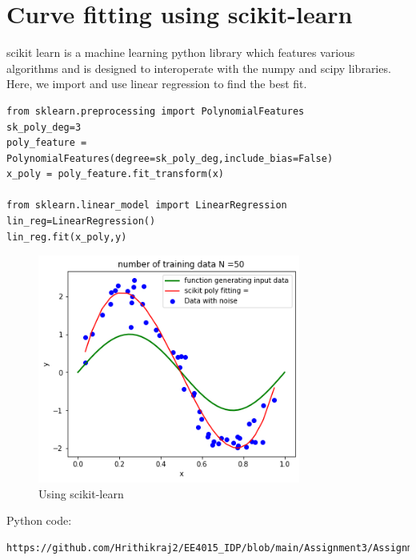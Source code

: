 \documentclass[journal,12pt,twocolumn]{IEEEtran}
\begin{document}
\section{Curve fitting using scikit-learn}
scikit learn is a machine learning python library which features various algorithms and is designed to interoperate with the numpy and scipy libraries.
Here, we import and use linear regression to find the best fit.
\begin{lstlisting}
from sklearn.preprocessing import PolynomialFeatures
sk_poly_deg=3
poly_feature = PolynomialFeatures(degree=sk_poly_deg,include_bias=False)
x_poly = poly_feature.fit_transform(x)

from sklearn.linear_model import LinearRegression
lin_reg=LinearRegression()
lin_reg.fit(x_poly,y)
\end{lstlisting}
\begin{figure}[!h]
\begin{center}
\includegraphics[width=3.4in]{figs/fig4.png}
\end{center}
\caption{Using scikit-learn}
\label{fig:4}
\end{figure}
Python code:
\begin{lstlisting}
https://github.com/Hrithikraj2/EE4015_IDP/blob/main/Assignment3/Assignment_3_Regularization.ipynb
\end{lstlisting}
\end{document}
